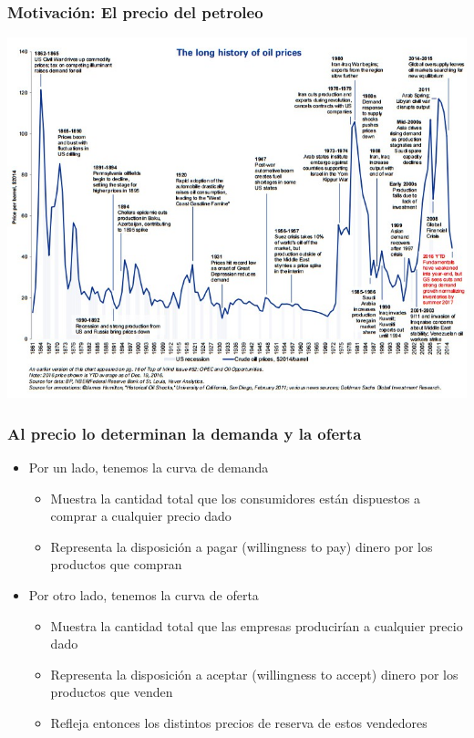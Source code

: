 \documentclass{beamer}
\begin{document}
\begin{frame}
\frametitle{Motivación: El precio del petroleo}
\centering
\includegraphics[scale=0.35]{../Figures/Tema_04.01_new.jpg}
\end{frame} 

\begin{frame}
\frametitle{Al precio lo determinan la demanda y la oferta}
\begin{itemize}
    \item Por un lado, tenemos la curva de demanda
    \begin{itemize}
        \item Muestra la cantidad total que los consumidores están dispuestos a comprar a cualquier precio dado
        \item Representa la disposición a pagar (willingness to pay) dinero por los productos que compran
    \end{itemize}
    \vspace{2mm}
    \item Por otro lado, tenemos la curva de oferta
    \begin{itemize}
        \item Muestra la cantidad total que las empresas producirían a cualquier precio dado
        \item Representa la disposición a aceptar (willingness to accept) dinero por los productos que venden
        \item Refleja entonces los distintos precios de reserva de estos vendedores
        \end{itemize}
\end{itemize}
\end{frame}
\end{document}
